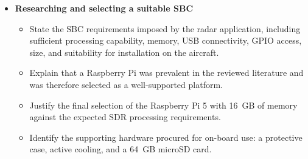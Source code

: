 \begin{itemize}
    \item \textbf{Researching and selecting a suitable SBC}
    \begin{itemize}
        \item State the SBC requirements imposed by the radar application, including sufficient processing capability, memory, USB connectivity, GPIO access, size, and suitability for installation on the aircraft.
        \item Explain that a Raspberry Pi was prevalent in the reviewed literature and was therefore selected as a well-supported platform.
        \item Justify the final selection of the Raspberry Pi 5 with 16~GB of memory against the expected SDR processing requirements.
        \item Identify the supporting hardware procured for on-board use: a protective case, active cooling, and a 64~GB microSD card.
    \end{itemize}


\end{itemize}
